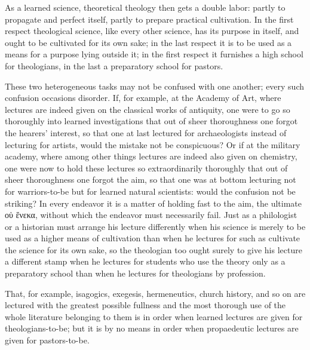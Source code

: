 \documentclass[12pt,a4paper]{book}
\begin{document}
As a learned science, theoretical theology then gets a double labor: partly to propagate and perfect
itself, partly to prepare practical cultivation. In the first respect theological science, like every
other science, has its purpose in itself, and ought to be cultivated for its own sake; in the last
respect it is to be used as a means for a purpose
lying outside it; in the first respect it furnishes a high school for theologians, in the last a
preparatory school for pastors.

These two heterogeneous tasks may not be confused with one another; every such confusion occasions
disorder. If, for example, at the Academy of Art, where lectures are indeed given on the classical
works of antiquity, one were to go so thoroughly into learned investigations that out of sheer
thoroughness one forgot the hearers' interest, so that one at last lectured for archaeologists instead
of lecturing for artists, would the mistake not be conspicuous? Or if at the military academy, where
among other things lectures are indeed also given on chemistry, one were now to hold these lectures so
extraordinarily thoroughly that out of sheer thoroughness one forgot the aim, so that one was at bottom
lecturing not for warriors-to-be but for learned natural scientists: would the confusion not be
striking? In every endeavor it is a matter of holding fast to the aim, the ultimate οὑ ἕνεκα, without
which the endeavor must necessarily fail. Just as a philologist or a historian must arrange his lecture
differently when his science is merely to be used as a higher means of cultivation than when he
lectures for such as cultivate the science for its own sake, so the theologian too ought surely to give
his lecture a different stamp when he lectures for students who use the theory only as a preparatory
school than when he lectures for theologians by profession.

That, for example, isagogics, exegesis, hermeneutics, church history, and so on are lectured with the
greatest possible fullness and the most thorough use of the whole literature belonging to them is in
order when learned lectures are given for theologians-to-be; but it is by no means in order when
propaedeutic lectures are given for pastors-to-be.
\end{document}
